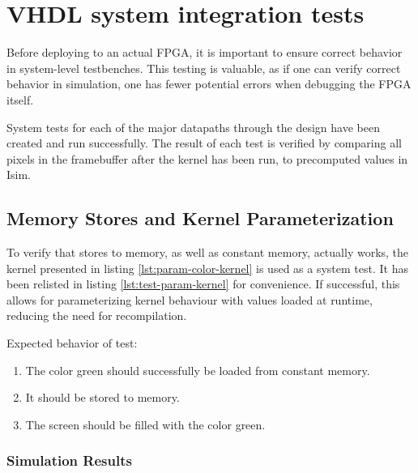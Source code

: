 \documentclass[../main/report.tex]{subfiles}
\begin{document}
\section{VHDL system integration tests}


Before deploying to an actual FPGA, it is important to ensure correct behavior in system-level testbenches.
This testing is valuable, as if one can verify correct behavior in simulation, one has fewer potential errors when debugging the FPGA itself.

System tests for each of the major datapaths through the design have been created and run successfully.
The result of each test is verified by comparing all pixels in the framebuffer after the kernel has been run, to precomputed values in Isim.


\subsection{Memory Stores and Kernel Parameterization}

To verify that stores to memory, as well as constant memory, actually works, the kernel presented in listing \ref{lst:param-color-kernel} is used as a system test.
It has been relisted in listing \ref{lst:test-param-kernel} for convenience.
If successful, this allows for parameterizing kernel behaviour with values loaded at runtime, reducing the need for recompilation.


Expected behavior of test:
\begin{enumerate}
  \item
    The color green should successfully be loaded from constant memory.
  \item
    It should be stored to memory.
  \item
    The screen should be filled with the color green.
\end{enumerate}

\subsubsection*{Simulation Results}
\end{document}
